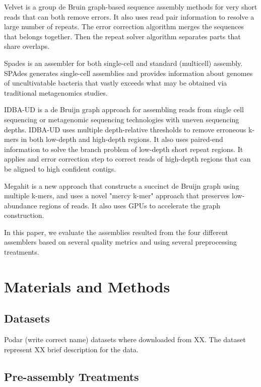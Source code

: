 Velvet \cite{velvet} is a group de Bruin graph-based sequence assembly methods for very short reads that can both remove errors. It also uses read pair information to resolve a large number of repeats.  The error correction algorithm merges the sequences that belongs together. Then the repeat solver algorithm separates parts that share overlaps. 


Spades \cite{spades} is an assembler for both single-cell and standard (multicell) assembly. SPAdes generates single-cell assemblies and provides information about genomes of uncultivatable bacteria that vastly exceeds what may be obtained via traditional metagenomics studies. 

IDBA-UD \cite{idba} is a de Bruijn graph approach for assembling reads from single cell sequencing or metagenomic sequencing technologies with uneven sequencing depths. IDBA-UD uses multiple depth-relative thresholds to remove erroneous k-mers in both low-depth and high-depth regions. It also uses paired-end information  to solve the branch problem of low-depth short repeat regions. It applies and error correction step to correct reads of high-depth
regions that can be aligned to high confident contigs.


Megahit \cite{megahit} is a new approach that constructs a succinct de Bruijn graph using multiple k-mers, and uses a novel "mercy k-mer" approach that preserves low-abundance regions of reads. It also uses GPUs to accelerate the graph construction.

In this paper, we evaluate the assemblies resulted from the four different assemblers based on several quality metrics and using several preprocessing treatments. 

\section*{Materials and Methods}

\subsection*{Datasets}


Podar (write correct name) datasets where downloaded from XX. The dataset represent XX brief description for the data. 

\subsection*{Pre-assembly Treatments  }


